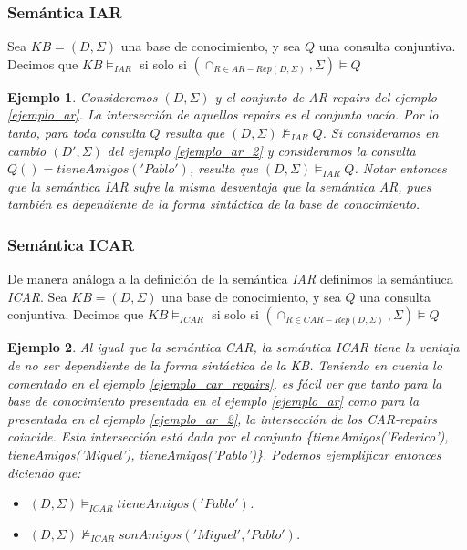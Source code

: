 \documentclass[11pt,a4paper,twoside]{tesis}
\newtheorem{exmp}{Ejemplo}
\begin{document}
\subsubsection{Semántica IAR}
Sea $KB = (D, \Sigma)$ una base de conocimiento, y sea $Q$ una consulta conjuntiva. Decimos que $KB \models_{IAR}$ si solo si $(\cap_{R \in AR-Rep(D, \Sigma)}, \Sigma)\models Q$ 

\begin{exmp}\label{ejemplo_iar}
Consideremos $(D, \Sigma)$ y el conjunto de \textit{AR-repairs} del ejemplo \ref{ejemplo_ar}. La intersección de aquellos \textit{repairs} es el conjunto vacío. Por lo tanto, para toda consulta $Q$ resulta que $(D, \Sigma)\not\models_{IAR} Q$. Si consideramos en cambio $(D\prime, \Sigma)$ del ejemplo \ref{ejemplo_ar_2} y consideramos la consulta $Q() = tieneAmigos('Pablo')$, resulta que $(D, \Sigma)\models_{IAR} Q$. Notar entonces que la semántica \textit{IAR} sufre la misma desventaja que la semántica \textit{AR}, pues también es dependiente de la forma sintáctica de la base de conocimiento.
\end{exmp}

\subsubsection{Semántica ICAR}
De manera análoga a la definición de la semántica \textit{IAR} definimos la semántiuca \textit{ICAR}. Sea $KB = (D, \Sigma)$ una base de conocimiento, y sea $Q$ una consulta conjuntiva. Decimos que $KB \models_{ICAR}$ si solo si $(\cap_{R \in CAR-Rep(D, \Sigma)}, \Sigma)\models Q$

\begin{exmp}
Al igual que la semántica \textit{CAR}, la semántica \textit{ICAR} tiene la ventaja de no ser dependiente de la forma sintáctica de la KB. Teniendo en cuenta lo comentado en el ejemplo \ref{ejemplo_car_repairs}, es fácil ver que tanto para la base de conocimiento presentada en el ejemplo \ref{ejemplo_ar} como para la presentada en el ejemplo \ref{ejemplo_ar_2}, la intersección de los \textit{CAR-repairs} coincide. Esta intersección está dada por el conjunto \{tieneAmigos('Federico'), tieneAmigos('Miguel'), tieneAmigos('Pablo')\}. Podemos ejemplificar entonces diciendo que:
\begin{itemize}
    \item $(D, \Sigma) \models_{ICAR} tieneAmigos('Pablo')$.
    \item $(D, \Sigma) \not\models_{ICAR} sonAmigos('Miguel','Pablo')$.
\end{itemize}

\end{exmp}
\end{document}
